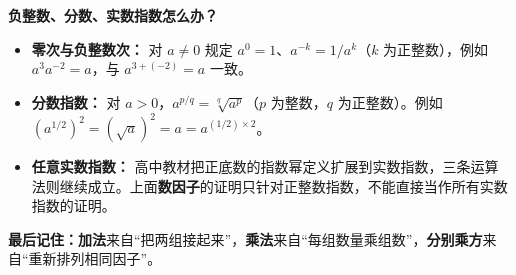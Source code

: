 \begin{proofbox}
    \medskip
    \textbf{\textcolor{CProof}{负整数、分数、实数指数怎么办？}}\par
    \begin{itemize}[leftmargin=*,itemsep=0.35em,topsep=0.3em]
        \item \textbf{零次与负整数次：} 对 $a\ne0$ 规定 $a^0=1$、$a^{-k}=1/a^k$（$k$ 为正整数），例如 $a^3a^{-2}=a$，与 $a^{3+(-2)}=a$ 一致。
        \item \textbf{分数指数：} 对 $a>0$，$a^{p/q}=\sqrt[q]{a^p}$（$p$ 为整数，$q$ 为正整数）。例如 $(a^{1/2})^2=(\sqrt a)^2=a=a^{(1/2)\times2}$。
        \item \textbf{任意实数指数：} 高中教材把正底数的指数幂定义扩展到实数指数，三条运算法则继续成立。上面\textbf{数因子}的证明只针对正整数指数，不能直接当作所有实数指数的证明。
    \end{itemize}
    \begin{center}
    
    \end{center}

    \textbf{\textcolor{CProof}{最后记住：}}\textbf{加法}来自“把两组接起来”，\textbf{乘法}来自“每组数量乘组数”，\textbf{分别乘方}来自“重新排列相同因子”。
\end{proofbox}
